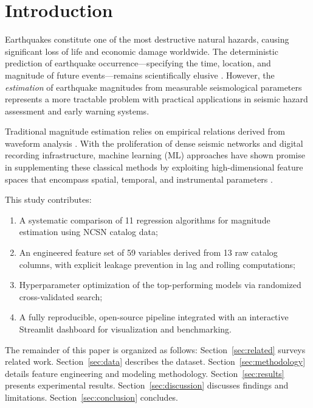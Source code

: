 \documentclass[journal,10pt,twocolumn]{IEEEtran}
\begin{document}
\section{Introduction}
\label{sec:introduction}

Earthquakes constitute one of the most destructive natural hazards, causing significant loss of life and economic damage worldwide. The deterministic prediction of earthquake occurrence—specifying the time, location, and magnitude of future events—remains scientifically elusive \cite{geller1997}. However, the \emph{estimation} of earthquake magnitudes from measurable seismological parameters represents a more tractable problem with practical applications in seismic hazard assessment and early warning systems.

Traditional magnitude estimation relies on empirical relations derived from waveform analysis \cite{kanamori1977}. With the proliferation of dense seismic networks and digital recording infrastructure, machine learning (ML) approaches have shown promise in supplementing these classical methods by exploiting high-dimensional feature spaces that encompass spatial, temporal, and instrumental parameters \cite{mousavi2020, derakhshani2013}.

This study contributes:
\begin{enumerate}
    \item A systematic comparison of 11 regression algorithms for magnitude estimation using NCSN catalog data;
    \item An engineered feature set of 59 variables derived from 13 raw catalog columns, with explicit leakage prevention in lag and rolling computations;
    \item Hyperparameter optimization of the top-performing models via randomized cross-validated search;
    \item A fully reproducible, open-source pipeline integrated with an interactive Streamlit dashboard for visualization and benchmarking.
\end{enumerate}

The remainder of this paper is organized as follows: Section~\ref{sec:related} surveys related work. Section~\ref{sec:data} describes the dataset. Section~\ref{sec:methodology} details feature engineering and modeling methodology. Section~\ref{sec:results} presents experimental results. Section~\ref{sec:discussion} discusses findings and limitations. Section~\ref{sec:conclusion} concludes.
\end{document}
